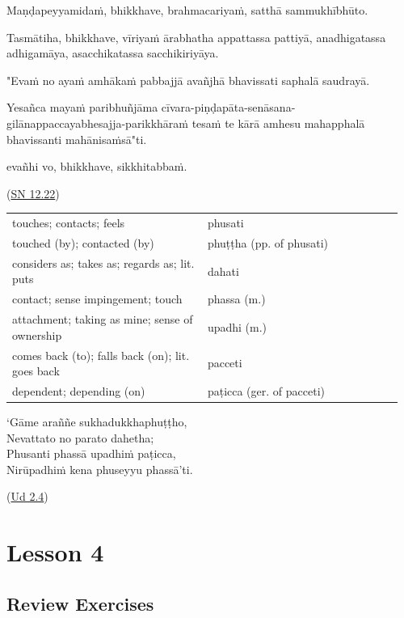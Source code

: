 \documentclass[11pt,oneside]{memoir}
\begin{document}
{\raggedright

Maṇḍapeyyamidaṁ, bhikkhave, brahmacariyaṁ, satthā sammukhībhūto.

Tasmātiha, bhikkhave, vīriyaṁ ārabhatha appattassa pattiyā, anadhigatassa
adhigamāya, asacchikatassa sacchikiriyāya.

"Evaṁ no ayaṁ amhākaṁ pabbajjā avañjhā bhavissati saphalā saudrayā.

Yesañca mayaṁ paribhuñjāma
cīvara-piṇḍapāta-senāsana-gilānappaccayabhesajja-parikkhāraṁ tesaṁ te kārā
amhesu mahapphalā bhavissanti mahānisaṁsā"ti.

evañhi vo, bhikkhave, sikkhitabbaṁ.

(\href{https://suttacentral.net/sn12.22/en/sujato}{SN 12.22})

\par}

\bigskip

\begin{longtable}{L{0.48\linewidth} L{0.48\linewidth}}
touches; contacts; feels & phusati\\
touched (by); contacted (by) & phuṭṭha (pp. of phusati)\\
considers as; takes as; regards as; lit. puts & dahati\\
contact; sense impingement; touch & phassa (m.)\\
attachment; taking as mine; sense of ownership & upadhi (m.)\\
comes back (to); falls back (on); lit. goes back & pacceti\\
dependent; depending (on) & paṭicca (ger. of pacceti)\\
\end{longtable}

\bigskip

`Gāme araññe sukhadukkhaphuṭṭho, \\
Nevattato no parato dahetha; \\
Phusanti phassā upadhiṁ paṭicca, \\
Nirūpadhiṁ kena phuseyyu phassā'ti.

(\href{https://suttacentral.net/ud2.4/pli/ms}{Ud 2.4})
\chapter{Lesson 4}
\label{sec:orgd38075f}
\section{Review Exercises}
\label{sec:orgfa25adf}
\end{document}
